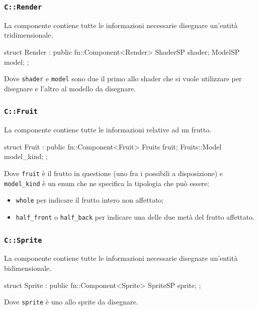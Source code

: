 \subsubsection{\texttt{C::Render}}
La componente  contiene tutte le informazioni necessarie disegnare un'entità tridimensionale.
\begin{cpp}
 struct Render : public fn::Component<Render> {
     ShaderSP shader;
     ModelSP model;
 };
\end{cpp}
Dove \texttt{shader} e \texttt{model} sono due  il primo allo shader che si vuole utilizzare per disegnare e l'altro al modello da disegnare.


\subsubsection{\texttt{C::Fruit}}
La componente  contiene tutte le informazioni relative ad un frutto.
\begin{cpp}
 struct Fruit : public fn::Component<Fruit> {
     Fruits fruit;
     Fruits::Model model_kind;
 };
\end{cpp}
Dove \texttt{fruit} è il frutto in questione (uno fra i possibili a disposizione) e \texttt{model\_kind} è un enum che ne specifica la tipologia che può essere: 
\begin{itemize}
	\item \texttt{whole} per indicare il frutto intero non affettato; 
	\item \texttt{half\_front} o \texttt{half\_back} per indicare una delle due metà del frutto affettato.
\end{itemize}


\subsubsection{\texttt{C::Sprite}}
La componente  contiene tutte le informazioni necessarie disegnare un'entità bidimensionale.
\begin{cpp}
 struct Sprite : public fn::Component<Sprite> {
	 SpriteSP sprite;
 };
\end{cpp}
Dove \texttt{sprite} è uno  allo sprite da disegnare. 


